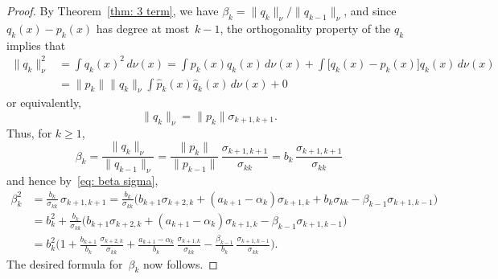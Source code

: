 \documentclass[12pt,a4paper]{article}
\begin{document}
\begin{proof}
By Theorem~\ref{thm: 3 term}, we have 
$\beta_k=\|q_k\|_\nu/\|q_{k-1}\|_\nu$, and since $q_k(x)-p_k(x)$ has degree at
most~$k-1$, the orthogonality property of the $q_k$ implies that
\begin{align*}
\|q_k\|_\nu^2&=\int q_k(x)^2\,d\nu(x)=\int p_k(x)q_k(x)\,d\nu(x)
	+\int\bigl[q_k(x)-p_k(x)\bigr]q_k(x)\,d\nu(x)\\
	&=\|p_k\|\|q_k\|_\nu\int\hat p_k(x)\hat q_k(x)\,d\nu(x)+0
\end{align*}
or equivalently, 
\begin{equation}\label{eq: norm pk qk}
\|q_k\|_\nu=\|p_k\|\sigma_{k+1,k+1}.
\end{equation}
Thus, for $k\ge1$,
\[
\beta_k=\frac{\|q_k\|_\nu}{\|q_{k-1}\|_\nu}
	=\frac{\|p_k\|}{\|p_{k-1}\|}\, 
		\frac{\sigma_{k+1,k+1}}{\sigma_{kk}}
	=b_k\,\frac{\sigma_{k+1,k+1}}{\sigma_{kk}}
\]
and hence by~\eqref{eq: beta sigma},
\begin{align*}
\beta_k^2&=\frac{b_k}{\sigma_{kk}}\,\sigma_{k+1,k+1}
	=\frac{b_k}{\sigma_{kk}}\biggl(
	b_{k+1}\sigma_{k+2,k}+(a_{k+1}-\alpha_k)\sigma_{k+1,k}
	+b_k\sigma_{kk}-\beta_{k-1}\sigma_{k+1,k-1}\biggr)\\
	&=b_k^2+\frac{b_k}{\sigma_{kk}}\biggl(
	b_{k+1}\sigma_{k+2,k}+(a_{k+1}-\alpha_k)\sigma_{k+1,k}
	-\beta_{k-1}\sigma_{k+1,k-1}\biggr)\\
	&=b_k^2\biggl(1
		+\frac{b_{k+1}}{b_k}\,\frac{\sigma_{k+2,k}}{\sigma_{kk}}
		+\frac{a_{k+1}-\alpha_k}{b_k}\,
			\frac{\sigma_{k+1,k}}{\sigma_{kk}}
		-\frac{\beta_{k-1}}{b_k}\,
			\frac{\sigma_{k+1,k-1}}{\sigma_{kk}}\biggr).
\end{align*}
The desired formula for~$\beta_k$ now follows.


\end{proof}
\end{document}
